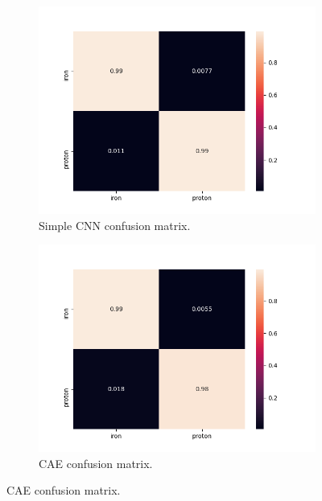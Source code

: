 \begin{figure}[H]
\begin{subfigure}{.5\textwidth}
  \centering
  \includegraphics[width=.8\linewidth]{imagenes/06_Experimentacion/simplecnncm.png}  
  \caption{Simple CNN confusion matrix.}
  \label{fig:simplecnncm}
\end{subfigure}
\begin{subfigure}{.5\textwidth}
  \centering
  \includegraphics[width=.8\linewidth]{imagenes/06_Experimentacion/caecm.png}  
  \caption{CAE confusion matrix.}
  \label{fig:caecm}
\end{subfigure}

\newline


\end{figure}
